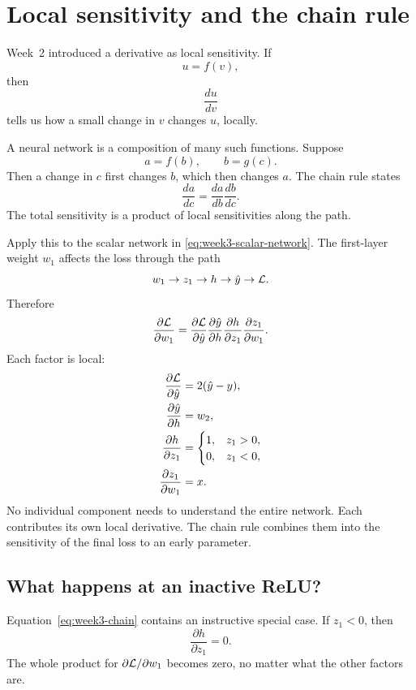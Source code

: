 \section{Local sensitivity and the chain rule}

Week~2 introduced a derivative as local sensitivity. If
\[
  u=f(v),
\]
then
\[
  \frac{du}{dv}
\]
tells us how a small change in \(v\) changes \(u\), locally.

A neural network is a composition of many such functions. Suppose
\[
  a=f(b),\qquad b=g(c).
\]
Then a change in \(c\) first changes \(b\), which then changes \(a\). The chain rule states
\[
  \frac{da}{dc}
  =\frac{da}{db}\frac{db}{dc}.
\]
The total sensitivity is a product of local sensitivities along the path.

Apply this to the scalar network in \cref{eq:week3-scalar-network}. The first-layer weight \(w_1\) affects the loss through the path
\[
  w_1 \rightarrow z_1 \rightarrow h \rightarrow \hat y \rightarrow \mathcal{L}.
\]
Therefore
\begin{equation}
  \frac{\partial\mathcal{L}}{\partial w_1}
  =
  \frac{\partial\mathcal{L}}{\partial\hat y}
  \frac{\partial\hat y}{\partial h}
  \frac{\partial h}{\partial z_1}
  \frac{\partial z_1}{\partial w_1}.
  \label{eq:week3-chain}
\end{equation}
Each factor is local:
\begin{align}
  \frac{\partial\mathcal{L}}{\partial\hat y} &= 2(\hat y-y),\\
  \frac{\partial\hat y}{\partial h} &= w_2,\\
  \frac{\partial h}{\partial z_1} &=
  \begin{cases}
    1,&z_1>0,\\
    0,&z_1<0,
  \end{cases}\\
  \frac{\partial z_1}{\partial w_1} &= x.
\end{align}
No individual component needs to understand the entire network. Each contributes its own local derivative. The chain rule combines them into the sensitivity of the final loss to an early parameter.

\subsection{What happens at an inactive ReLU?}

Equation~\eqref{eq:week3-chain} contains an instructive special case. If \(z_1<0\), then
\[
  \frac{\partial h}{\partial z_1}=0.
\]
The whole product for \(\partial\mathcal{L}/\partial w_1\) becomes zero, no matter what the other factors are.

